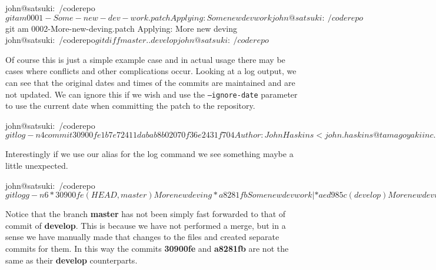 \begin{code}
john@satsuki:~/coderepo$ git am 0001-Some-new-dev-work.patch
Applying: Some new dev work
john@satsuki:~/coderepo$ git am 0002-More-new-deving.patch
Applying: More new deving
john@satsuki:~/coderepo$ git diff master..develop
john@satsuki:~/coderepo$
\end{code}

Of course this is just a simple example case and in actual usage there may be cases where conflicts and other complications occur.
Looking at a log output, we can see that the original dates and times of the commits are maintained and are not updated.
We can ignore this if we wish and use the \texttt{--ignore-date} parameter to use the current date when committing the patch to the repository.

\begin{code}
john@satsuki:~/coderepo$ git log -n4
commit 30900fe1b7e72411dabab8b02070f36e2431f704
Author: John Haskins <john.haskins@tamagoyakiinc.koala>
Date:   Thu Jul 7 19:02:15 2011 +0100

    More new deving

commit a8281fb589e36389cc8cb0da7ebee225b4d1adfc
Author: John Haskins <john.haskins@tamagoyakiinc.koala>
Date:   Thu Jul 7 19:01:59 2011 +0100

    Some new dev work

commit f8d5100142b43ffaba9bbd539ba4fd92af79bf0e
Author: John Haskins <john.haskins@tamagoyakiinc.koala>
Date:   Thu Jul 7 08:39:29 2011 +0100

    Finished new dev

commit 1968324ce2899883fca76bc25496bcf2b15e7011
Author: John Haskins <john.haskins@tamagoyakiinc.koala>
Date:   Thu Jul 7 08:39:07 2011 +0100

    Start new dev
john@satsuki:~/coderepo$
\end{code}

Interestingly if we use our alias for the log command we see something maybe a little unexpected.

\begin{code}
john@satsuki:~/coderepo$ git logg -n6
* 30900fe (HEAD, master) More new deving
* a8281fb Some new dev work
| * aed985c (develop) More new deving
| * af3c6d7 Some new dev work
|/  
* f8d5100 Finished new dev
* 1968324 Start new dev
john@satsuki:~/coderepo$ 
\end{code}

Notice that the branch \textbf{master} has not been simply fast forwarded to that of commit of \textbf{develop}.
This is because we have not performed a merge, but in a sense we have manually made that changes to the files and created separate commits for them.
In this way the commits \textbf{30900fe} and \textbf{a8281fb} are not the same as their \textbf{develop} counterparts.

